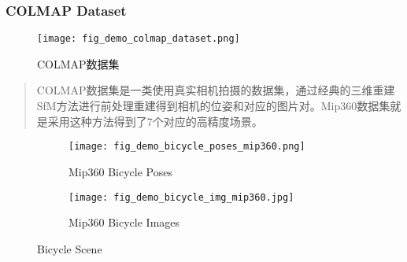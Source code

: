 \begin{frame}
    \frametitle{COLMAP Dataset}
    \begin{figure}[H]
        \texttt{[image: fig\_demo\_colmap\_dataset.png]}
        \caption[short]{COLMAP数据集}
    \end{figure}
    \begin{quote}
        COLMAP数据集是一类使用真实相机拍摄的数据集，通过经典的三维重建SfM方法进行前处理重建得到相机的位姿和对应的图片对。Mip360数据集就是采用这种方法得到了7个对应的高精度场景。
    \end{quote}
\end{frame}

\begin{figure}
    \centering
    \begin{subfigure}{0.48\linewidth}
        \texttt{[image: fig\_demo\_bicycle\_poses\_mip360.png]}
        \caption{Mip360 Bicycle Poses}
    \end{subfigure}
    \begin{subfigure}{0.48\linewidth}
        \texttt{[image: fig\_demo\_bicycle\_img\_mip360.jpg]}
        \caption{Mip360 Bicycle Images}
    \end{subfigure}
    \caption{Bicycle Scene}
    \label{mip360:dataset:bicycle}
\end{figure}
